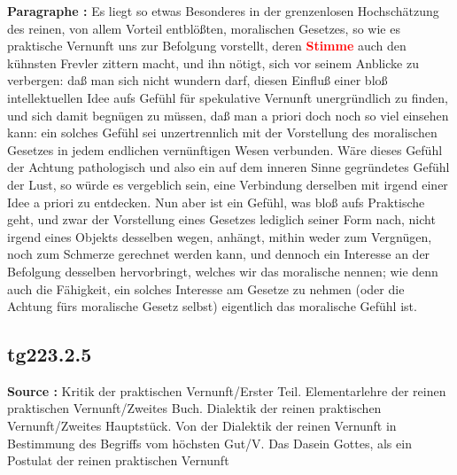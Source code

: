 \documentclass[a4paper,12pt,twoside]{book}
\newcommand{\match}[1]{\textcolor{red}{\textbf{#1}}}
\begin{document}
	\textbf{Paragraphe : }Es liegt so etwas Besonderes in der grenzenlosen Hochschätzung des reinen, von allem Vorteil entblößten, moralischen Gesetzes, so wie es praktische Vernunft uns zur Befolgung vorstellt, deren \match{Stimme} auch den kühnsten Frevler zittern macht, und ihn nötigt, sich vor seinem Anblicke zu verbergen: daß man sich nicht wundern darf, diesen Einfluß einer bloß intellektuellen Idee aufs Gefühl für spekulative Vernunft unergründlich zu finden, und sich damit begnügen zu müssen, daß man a priori doch noch so viel einsehen kann: ein solches Gefühl sei unzertrennlich mit der Vorstellung des moralischen Gesetzes in jedem endlichen vernünftigen Wesen verbunden. Wäre dieses Gefühl der Achtung pathologisch und also ein auf dem inneren Sinne gegründetes Gefühl der Lust, so würde es vergeblich sein, eine Verbindung derselben mit irgend einer Idee a priori zu entdecken. Nun aber ist ein Gefühl, was bloß aufs Praktische geht, und zwar der Vorstellung eines Gesetzes lediglich seiner Form nach, nicht irgend eines Objekts desselben wegen, anhängt, mithin weder zum Vergnügen, noch zum Schmerze gerechnet werden kann, und dennoch ein Interesse an der Befolgung desselben hervorbringt, welches wir das moralische nennen; wie denn auch die Fähigkeit, ein solches  Interesse am Gesetze zu nehmen (oder die Achtung fürs moralische Gesetz selbst) eigentlich das moralische Gefühl ist. 
	
	\subsection*{tg223.2.5} 
	\textbf{Source : }Kritik der praktischen Vernunft/Erster Teil. Elementarlehre der reinen praktischen Vernunft/Zweites Buch. Dialektik der reinen praktischen Vernunft/Zweites Hauptstück. Von der Dialektik der reinen Vernunft in Bestimmung des Begriffs vom höchsten Gut/V. Das Dasein Gottes, als ein Postulat der reinen praktischen Vernunft\\  
	
\end{document}

